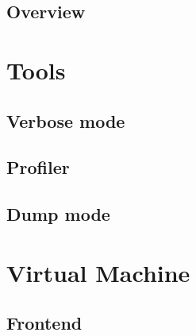 \documentclass[12pt, oneside]{Thesis}
\begin{document}

\clearpage
{}
\printglossary[title=List of Symbols,toctitle=List of Symbols]



\mainmatter
\pagestyle{fancy}

\clearpage
\chapter{Overview}
\label{Chapt:Overview}


\part{Tools}
\label{Part:Tools}

  \chapter{Verbose mode}
  \label{Chapt:Verbose}
  

  \chapter{Profiler}
  \label{Chapt:Profiler}
  

  \chapter{Dump mode}
  \label{Chapt:Dump-mode}
  

\part{Virtual Machine}
\label{Part:VM}

  \chapter{Frontend}
  \label{Chapt:frontend}
  
\end{document}
